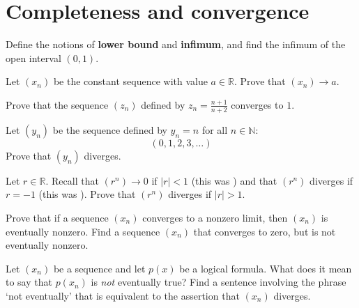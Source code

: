 \section{Completeness and convergence}


\begin{exercise}
\label{exDefineLowerBoundInfimum}
Define the notions of \textbf{lower bound} and \textbf{infimum}, and find the infimum of the open interval $(0,1)$.
\end{exercise}

\begin{exercise}
Let $(x_n)$ be the constant sequence with value $a \in \mathbb{R}$. Prove that $(x_n) \to a$.
\end{exercise}

\begin{exercise}
Prove that the sequence $(z_n)$ defined by $z_n=\frac{n+1}{n+2}$ converges to $1$.
\end{exercise}

\begin{exercise}
Let $(y_n)$ be the sequence defined by $y_n=n$ for all $n \in \mathbb{N}$:
\[ (0,1,2,3,\dots) \]
Prove that $(y_n)$ diverges.
\end{exercise}

\begin{exercise}
Let $r \in \mathbb{R}$. Recall that $(r^n) \to 0$ if $|r|<1$ (this was ) and that $(r^n)$ diverges if $r=-1$ (this was ). Prove that $(r^n)$ diverges if $|r|>1$.
\end{exercise}

\begin{exercise}
Prove that if a sequence $(x_n)$ converges to a nonzero limit, then $(x_n)$ is eventually nonzero. Find a sequence $(x_n)$ that converges to zero, but is not eventually nonzero.
\end{exercise}

\begin{exercise}
Let $(x_n)$ be a sequence and let $p(x)$ be a logical formula. What does it mean to say that $p(x_n)$ is \textit{not} eventually true? Find a sentence involving the phrase `not eventually' that is equivalent to the assertion that $(x_n)$ diverges.
\end{exercise}

